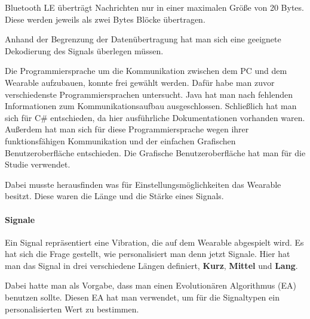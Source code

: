Bluetooth LE {\"u}bertr{\"a}gt Nachrichten nur in einer maximalen Gr{\"o}{\ss}e von 20 Bytes. Diese werden jeweils als zwei Bytes Bl{\"o}cke {\"u}bertragen. 

Anhand der Begrenzung der Daten{\"u}bertragung hat man sich eine geeignete Dekodierung des Signals {\"u}berlegen m{\"u}ssen. 

Die Programmiersprache um die Kommunikation zwischen dem PC und dem Wearable aufzubauen, konnte frei gew{\"a}hlt werden. 
Dafür habe man zuvor verschiedenste Programmiersprachen untersucht. 
Java hat man nach fehlenden Informationen zum Kommunikationsaufbau ausgeschlossen.
Schlie{\ss}lich hat man sich f{\"u}r C\# entschieden, da hier ausf{\"u}hrliche Dokumentationen vorhanden waren.
Außerdem hat man sich für diese Programmiersprache wegen ihrer funktionsfähigen Kommunikation und der einfachen Grafischen Benutzeroberfl{\"a}che entschieden. 
Die Grafische Benutzeroberfl{\"a}che hat man für die Studie verwendet.

Dabei musste herausfinden was f{\"u}r Einstellungsm{\"o}glichkeiten das Wearable besitzt. Diese waren die L{\"a}nge und die St{\"a}rke eines Signals.

\paragraph{Signale}

Ein Signal repr{\"a}sentiert eine Vibration, die auf dem Wearable abgespielt wird. Es hat sich die Frage gestellt, wie personalisiert man denn jetzt Signale. Hier hat man das Signal in drei verschiedene L{\"a}ngen definiert, \textbf{Kurz}, \textbf{Mittel} und \textbf{Lang}. 

Dabei hatte man als Vorgabe, dass man einen Evolution{\"a}ren Algorithmus (EA) benutzen sollte.
Diesen EA hat man verwendet, um f{\"u}r die Signaltypen ein personalisierten Wert zu bestimmen.

